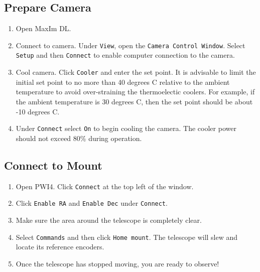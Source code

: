 \documentclass{article}
\begin{document}
		\subsection{Prepare Camera}

			\begin{enumerate}

				\item Open MaxIm DL.

				\item Connect to camera. Under \texttt{View}, open the \texttt{Camera Control Window}. Select \texttt{Setup} and then \texttt{Connect} to enable computer connection to the camera.

				\item Cool camera. Click \texttt{Cooler} and enter the set point. It is advisable to limit the initial set point to no more than 40 degrees C relative to the ambient temperature to avoid over-straining the thermoelectic coolers. For example, if the ambient temperature is 30 degrees C, then the set point should be about -10 degrees C.

				\item Under \texttt{Connect} select \texttt{On} to begin cooling the camera. The cooler power should not exceed 80\% during operation.

			\end{enumerate}

		\subsection{Connect to Mount}

			\begin{enumerate}

				\item Open PWI4. Click \texttt{Connect} at the top left of the window.

				\item Click \texttt{Enable RA} and \texttt{Enable Dec} under \texttt{Connect}.

				\item Make sure the area around the telescope is completely clear.

				\item Select \texttt{Commands} and then click \texttt{Home mount}. The telescope will slew and locate its reference encoders.

				\item Once the telescope has stopped moving, you are ready to observe!

			\end{enumerate}
\end{document}
